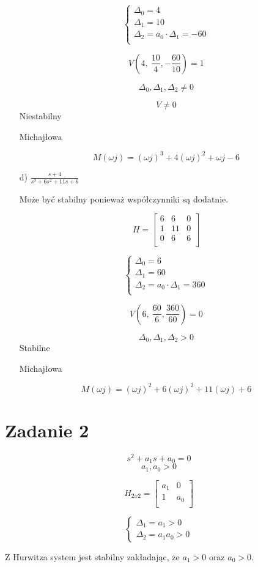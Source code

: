 \documentclass{article}
\begin{document}
\begin{itemize}
    \[\begin{cases}
        \Delta_{0}=4\\
        \Delta_{1}=10\\
        \Delta_{2}=a_{0}\cdot \Delta_{1}=-60\\
    \end{cases}\]

    $$ V\left(4, \ \frac{10}{4}, -\frac{60}{10}\right)=1$$

    $$\Delta_{0}, \Delta_{1}, \Delta_{2}\neq 0$$

    $$ V\neq 0$$
    Niestabilny

    Michajłowa

    $$  M(\omega j ) = (\omega j)^{3}+4(\omega j)^{2}+\omega j - 6$$


    \item[d)] $\frac{s+4}{s^{3}+6s^{2}+11s+6}$

    Może być stabilny ponieważ współczynniki są dodatnie.

    
    $$ H=
    \begin{bmatrix}
        6 & 6  & 0\\
        1 & 11 & 0\\
        0 & 6  & 6\\
        \end{bmatrix}$$

    \[\begin{cases}
        \Delta_{0}=6\\
        \Delta_{1}=60\\
        \Delta_{2}=a_{0}\cdot \Delta_{1}=360\\
    \end{cases}\]



    $$ V\left(6, \ \frac{60}{6}, \frac{360}{60}\right)=0$$


    $$\Delta_{0}, \Delta_{1}, \Delta_{2}> 0$$ 
    Stabilne

    Michajłowa

    $$M(\omega j)=(\omega j)^{2}+6(\omega j )^{2}+11(\omega j)+6$$


\end{itemize}

\section*{Zadanie 2}

$$s^{2}+a_{1}s+a_{0}=0$$
$$a_{1}, a_{0} > 0$$

$$ H_{2x2}=
    \begin{bmatrix}
        a_{1}& 0\\
        1& a_{0}\\
    \end{bmatrix}$$

    \[\begin{cases}
        \Delta_{1}=a_{1} > 0\\
        \Delta_{2}=a_{1}a_{0} > 0
    \end{cases}\]

    Z Hurwitza system jest stabilny zakładając, że $a_{1}>0$ oraz $a_{0}>0$.
\end{document}
